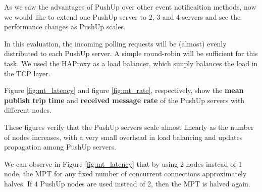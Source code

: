 As we saw the advantages of PushUp over other event notificaition methods, 
now we would like to extend one PushUp server to $2$,  $3$ and $4$ servers
and see the performance changes as PushUp scales.

In this evaluation, the incoming polling requests will be (almost) evenly 
distributed to each PushUp server. A simple round-robin will be sufficient 
for this task. We used the HAProxy\cite{HAProxy} as a load balancer, which
simply balances the load in the TCP layer.

Figure \ref{fig:mt_latency} and figure \ref{fig:mt_rate}, respectively, show
the {\bf mean publish trip time} and {\bf received message rate} of the 
PushUp servers with different nodes.

These figures verify that the PushUp servers scale almost linearly as the 
number of nodes increases, with a very small overhead in load balancing 
and updates propagation among PushUp servers. 

We can observe in Figure \ref{fig:mt_latency}
that by using 2 nodes instead of 1 node, the MPT for any fixed number of concurrent
connections approximately halves. If 4 PushUp nodes are used instead of 2, then
the MPT is halved again.

